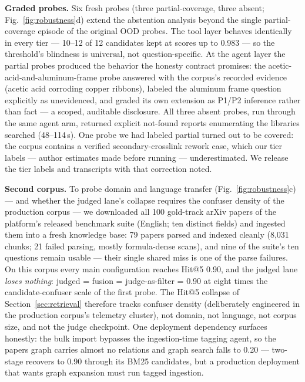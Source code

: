 \documentclass[preprint,12pt]{elsarticle}
\begin{document}
\textbf{Graded probes.} Six fresh probes (three partial-coverage, three
absent; Fig.~\ref{fig:robustness}d) extend the abstention analysis beyond
the single partial-coverage
episode of the original OOD probes. The tool layer behaves identically in
every tier --- 10--12 of 12
candidates kept at scores up to 0.983 --- so the threshold's blindness is
universal, not question-specific. At the agent layer the partial probes
produced the behavior the honesty contract promises: the
acetic-acid-and-aluminum-frame probe answered with the corpus's recorded
evidence (acetic acid corroding copper ribbons), labeled the aluminum
frame question explicitly as unevidenced, and graded its own extension as
P1/P2 inference rather than fact --- a scoped, auditable disclosure. All
three absent probes, run through the same agent arm, returned explicit
not-found reports enumerating the libraries searched (48--114\,s). One
probe we had labeled partial turned out to be covered: the corpus contains
a verified secondary-crosslink rework case, which our tier labels ---
author estimates made before running --- underestimated. We release the
tier labels and transcripts with that correction noted.

\textbf{Second corpus.} To probe domain and language transfer
(Fig.~\ref{fig:robustness}c) --- and
whether the judged lane's collapse requires the confuser density of the
production corpus --- we downloaded all 100 gold-track arXiv papers of
the platform's released benchmark suite (English; ten distinct fields)
and ingested them into a fresh knowledge base: 79 papers parsed and
indexed cleanly (8{,}031 chunks; 21 failed parsing, mostly
formula-dense scans), and nine of the suite's ten questions remain
usable --- their single shared miss is one of the parse failures. On
this corpus every main configuration reaches Hit@5 0.90, and the judged
lane \emph{loses nothing}: judged = fusion = judge-as-filter = 0.90 at
eight times the candidate-confuser scale of the first probe. The Hit@5
collapse of Section~\ref{sec:retrieval} therefore tracks confuser
density (deliberately engineered in the production corpus's telemetry
cluster), not domain, not language, not corpus size, and not the judge
checkpoint. One deployment dependency surfaces honestly: the bulk
import bypasses the ingestion-time tagging agent, so the papers graph
carries almost no relations and graph search falls to 0.20 ---
two-stage recovers to 0.90 through its BM25 candidates, but a
production deployment that wants graph expansion must run tagged
ingestion.
\end{document}
